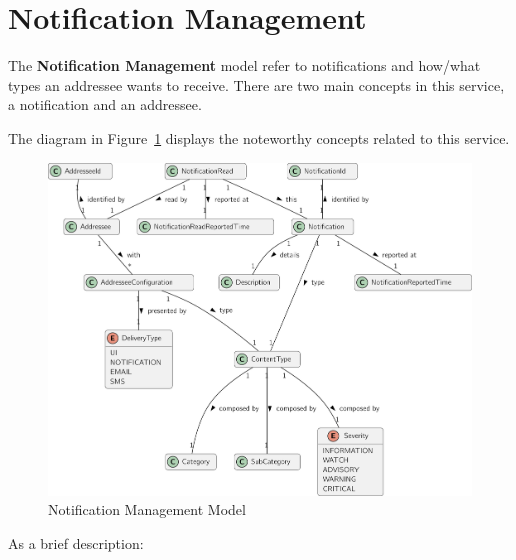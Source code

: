 \section{Notification Management}
\label{subsubsec:design:domain:bounded_contexts:notification}

The \textbf{Notification Management} model refer to notifications and how/what types an addressee wants to receive. There are two main concepts in this service, a notification and an addressee.

The diagram in Figure~\ref{fig:design:domain:bounded_contexts:notification:diagram} displays the noteworthy concepts related to this service.

\begin{figure}[H]
   \centering
  \includegraphics[page=1,width=\columnwidth]{assets/diagrams/design/domain/notification-management-model.pdf}
  \caption[Notification Management Model]{Notification Management Model}
  \label{fig:design:domain:bounded_contexts:notification:diagram}
\end{figure}

As a brief description:

